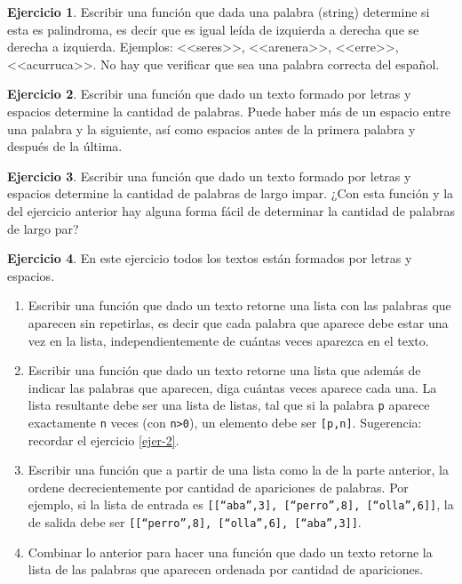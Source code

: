 \documentclass[a4paper,12pt]{book}
\theoremstyle{definition}
\newtheorem{ejercicio}{Ejercicio}
\begin{document}
	\begin{ejercicio}
		Escribir una función que dada una palabra (string) determine si esta es palindroma, es decir que es igual leída de izquierda a derecha que se derecha a izquierda. Ejemplos: <<seres>>, <<arenera>>, <<erre>>, <<acurruca>>. No hay que verificar que sea una palabra correcta del español. 
	\end{ejercicio}
	
	\begin{ejercicio}
		Escribir una función que dado un texto formado por letras y espacios determine la cantidad de palabras. Puede haber más de un espacio entre una palabra y la siguiente, así como espacios antes de la primera palabra y después de la última.
	\end{ejercicio}
	
	\begin{ejercicio}
		Escribir una función que dado un texto formado por letras y espacios determine la cantidad de palabras de largo impar. ¿Con esta función y la del ejercicio anterior hay alguna forma fácil de determinar la cantidad de palabras de largo par?
	\end{ejercicio}
	
	\begin{ejercicio} En este ejercicio todos los textos están formados por letras y espacios.
		\begin{enumerate}
			\item Escribir una función que dado un texto retorne una lista con las palabras que aparecen sin repetirlas, es decir que cada palabra que aparece debe estar una vez en la lista, independientemente de cuántas veces aparezca en el texto.
			
			\item Escribir una función que dado un texto retorne una lista que además de indicar las palabras que aparecen, diga cuántas veces aparece cada una. La lista resultante debe ser una lista de listas, tal que si la palabra {\tt p} aparece exactamente {\tt n} veces (con {\tt n>0}), un elemento debe ser {\tt [p,n]}. Sugerencia: recordar el ejercicio \ref{ejer-2}.
			
			\item Escribir una función que a partir de una lista como la de la parte anterior, la ordene decrecientemente por cantidad de apariciones de palabras. Por ejemplo, si la lista de entrada es {\tt [[``aba'',3], [``perro'',8], [``olla'',6]]}, la de salida debe ser {\tt [[``perro'',8], [``olla'',6], [``aba'',3]]}.
			
			\item Combinar lo anterior para hacer una función que dado un texto retorne la lista de las palabras que aparecen ordenada por cantidad de apariciones.
		\end{enumerate}
	\end{ejercicio}
	
\end{document}
